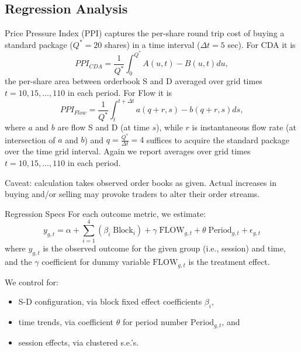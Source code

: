 \documentclass[10pt]{beamer}
\begin{document}
\subsection{Regression Analysis}

\begin{frame}{Price Pressure Index (PPI)}
captures the per-share round trip  cost of buying a standard package ($Q^*=20$ shares) in a time interval ($\Delta t = 5$ sec). \pause
For CDA it is
\begin{equation} \label{eq:ppicda}
    PPI_{CDA} = \frac{1}{Q^*}\int_0^{Q^*} A(u,t) - B(u,t) du,
\end{equation}
the per-share area between orderbook S and D averaged over grid times $t=10, 15, ... , 110$ in each period. \pause
For Flow it is
\begin{equation} \label{eq:ppiflow}
    PPI_{Flow} = \frac{1}{Q^*}\int_t^{t+\Delta t} a(q+r,s) - b(q+r,s) ds,
\end{equation}
where $a$ and $b$ are flow S and D (at time $s$), while $r$ is instantaneous flow rate (at intersection of $a$ and $b$) and 
$q=\frac{Q^*}{\Delta t}=4$ suffices to acquire the standard package over the time grid interval. Again we report averages over grid times $t=10, 15, ... , 110$ in each period. \pause

Caveat: calculation takes observed order books as given. Actual increases in buying and/or selling may provoke traders to alter their order streams.
\end{frame}


\begin{frame}{Regression Specs}
For each outcome metric, we estimate: 
\begin{equation} \label{eq:reg}
    y_{g,t} = \alpha + \sum^{4}_{i = 1} \left(\beta_i \; \text{Block}_i\right) + \gamma \; \text{FLOW}_{g,t} + \theta \; \text{Period}_{g,t} + \epsilon_{g,t}
\end{equation}
where $y_{g,t}$ is the observed outcome  for the given group (i.e., session) and time, and the $\gamma$ coefficient for dummy variable $\text{FLOW}_{g,t}$ is the treatment effect. \pause

We control for: 
\begin{itemize}
\item S-D configuration, via  block fixed effect coefficients $\beta_i$,  
\item time trends, via coefficient $\theta$ for period number $\text{Period}_{g,t}$, and
\item session effects, via clustered s.e.'s.
\end{itemize} \pause
 
\end{frame}
\end{document}
